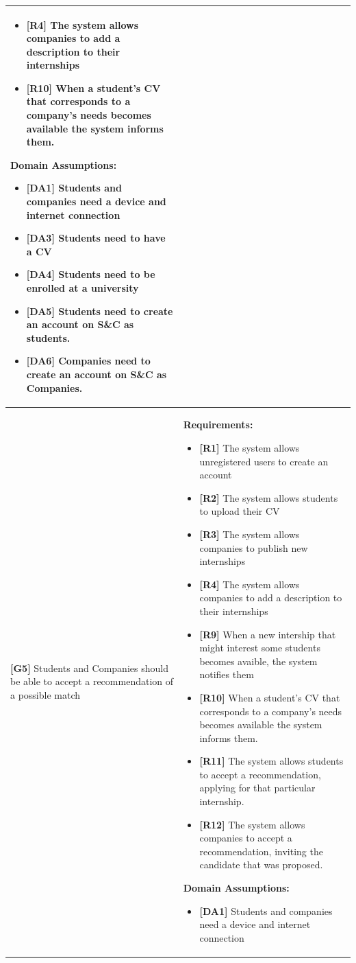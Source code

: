 \begin{longtable}{|p{}|p{}|}
\begin{itemize}
    \item \textbf{[R4]} The system allows companies to add a description to their internships
    \item \textbf{[R10]} When a student’s CV that corresponds to a company’s needs becomes available the system informs them.
\end{itemize}
\textbf{Domain Assumptions:}
\begin{itemize}
    \item \textbf{[DA1]} Students and companies need a device and internet connection
    \item \textbf{[DA3]} Students need to have a CV
     \item \textbf{[DA4]} Students need to be enrolled at a university
    \item \textbf{[DA5]} Students need to create an account on S\&C as students.
    \item \textbf{[DA6]} Companies need to create an account on S\&C as Companies.
\end{itemize} \\
\hline
\textbf{[G5]} Students and Companies should be able to accept a recommendation of a possible match
& 
\textbf{Requirements:}
\begin{itemize}
    \item \textbf{[R1]} The system allows unregistered users to create an account
    \item \textbf{[R2]} The system allows students to upload their CV
    \item \textbf{[R3]} The system allows companies to publish new internships
    \item \textbf{[R4]} The system allows companies to add a description to their internships
    \item  \textbf{[R9]} When a new intership that might interest some students becomes avaible, the system notifies them
    \item  \textbf{[R10]} When a student’s CV that corresponds to a company’s needs becomes available the system informs them.
    \item  \textbf{[R11]} The system allows students to accept a recommendation, applying for that particular internship.
    \item  \textbf{[R12]} The system allows companies to accept a recommendation, inviting the candidate that was proposed.
\end{itemize}
\textbf{Domain Assumptions:}
\begin{itemize}
     \item \textbf{[DA1]} Students and companies need a device and internet connection

\end{itemize}
\end{longtable}
